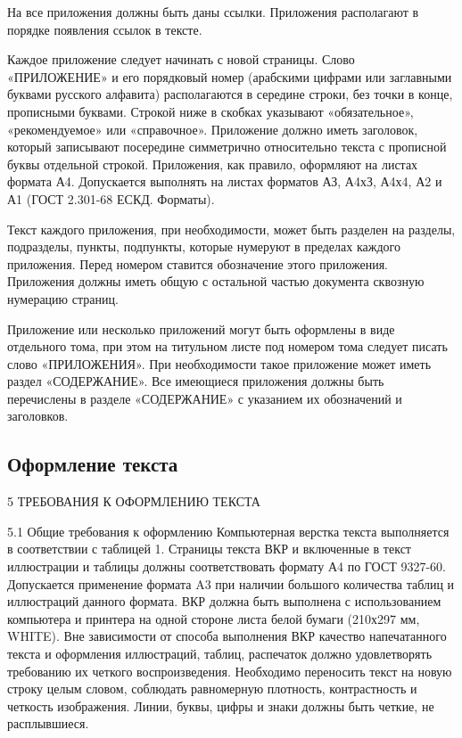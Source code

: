    На все приложения должны быть даны ссылки. Приложения располагают в порядке
    появления ссылок в тексте.

    Каждое приложение следует начинать с новой страницы. Слово «ПРИЛОЖЕНИЕ» и
    его порядковый номер (арабскими цифрами или заглавными буквами русского алфавита)
    располагаются в середине строки, без точки в конце, прописными буквами. Строкой ниже в
    скобках указывают «обязательное», «рекомендуемое» или «справочное».
    Приложение должно иметь заголовок, который записывают посередине симметрично
    относительно текста с прописной буквы отдельной строкой. Приложения, как правило, 
    оформляют на листах формата А4. Допускается выполнять на листах форматов АЗ, А4хЗ,
    А4х4, А2 и А1 (ГОСТ 2.301-68 ЕСКД. Форматы).

    Текст каждого приложения, при необходимости, может быть разделен на разделы,
    подразделы, пункты, подпункты, которые нумеруют в пределах каждого приложения. Перед
    номером ставится обозначение этого приложения. Приложения должны иметь общую с
    остальной частью документа сквозную нумерацию страниц.

    Приложение или несколько приложений могут быть оформлены в виде отдельного
    тома, при этом на титульном листе под номером тома следует писать слово «ПРИЛОЖЕНИЯ».
    При необходимости такое приложение может иметь раздел «СОДЕРЖАНИЕ». Все
    имеющиеся приложения должны быть перечислены в разделе «СОДЕРЖАНИЕ» с указанием
    их обозначений и заголовков.

    \subsection{Оформление текста}
    5 ТРЕБОВАНИЯ К ОФОРМЛЕНИЮ ТЕКСТА

    5.1 Общие требования к оформлению
    Компьютерная верстка текста выполняется в соответствии с таблицей 1. Страницы
    текста ВКР и включенные в текст иллюстрации и таблицы должны соответствовать формату
    А4 по ГОСТ 9327-60. Допускается применение формата A3 при наличии большого
    количества таблиц и иллюстраций данного формата. ВКР должна быть выполнена с
    использованием компьютера и принтера на одной стороне листа белой бумаги (210х297 мм,
    WHITE). Вне зависимости от способа выполнения ВКР качество напечатанного текста и
    оформления иллюстраций, таблиц, распечаток должно удовлетворять требованию их четкого
    воспроизведения. Необходимо переносить текст на новую строку целым словом, соблюдать
    равномерную плотность, контрастность и четкость изображения. Линии, буквы, цифры и
    знаки должны быть четкие, не расплывшиеся.

